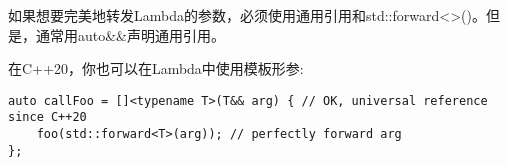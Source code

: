 如果想要完美地转发Lambda的参数，必须使用通用引用和std::forward<>()。但是，通常用auto\&\&声明通用引用。\par

在C++20，你也可以在Lambda中使用模板形参:\par

\begin{lstlisting}[caption={}]
auto callFoo = []<typename T>(T&& arg) { // OK, universal reference since C++20
	foo(std::forward<T>(arg)); // perfectly forward arg
};
\end{lstlisting}


